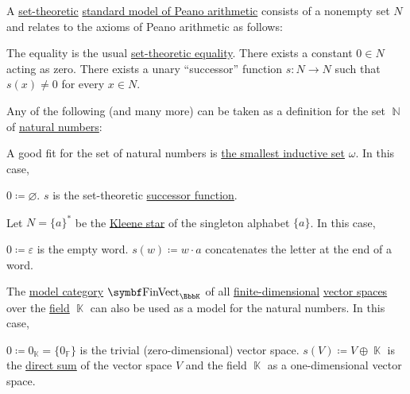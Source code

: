 \begin{example}\label{ex:natural_numbers_models}
  A \hyperref[sec:set_theory]{set-theoretic} \hyperref[def:peano_arithmetic]{standard model of Peano arithmetic} consists of a nonempty set \( N \) and relates to the axioms of Peano arithmetic as follows:
  \begin{RefList}
     The equality is the usual \hyperref[def:set_zfc]{set-theoretic equality}.
     There exists a constant \( 0 \in N \) acting as zero.
     There exists a unary \enquote{successor} function \( s: N \to N \) such that \( s(x) \neq 0 \) for every \( x \in N \).
  \end{RefList}

  Any of the following (and many more) can be taken as a definition for the set \( \BbbN \) of \hyperref[def:natural_numbers]{natural numbers}:
  \begin{DefEnum}
     A good fit for the set of natural numbers is \hyperref[def:smallest_inductive_set]{the smallest inductive set} \( \omega \). In this case,
    \begin{RefList}
       \( 0 \coloneqq \varnothing \).
       \( s \) is the set-theoretic \hyperref[def:successor_operator]{successor function}.
    \end{RefList}

     Let \( N = \{ a \}^{*} \) be the \hyperref[def:language/kleene_star]{Kleene star} of the singleton alphabet \( \{ a \} \). In this case,
    \begin{RefList}
       \( 0 \coloneqq \varepsilon \) is the empty word.
       \( s(w) \coloneqq w \cdot a \) concatenates the letter at the end of a word.
    \end{RefList}

     The \hyperref[def:first_order_model_category]{model category} \( \Cat{FinVect}_{\BbbK} \) of all \hyperref[def:vector_space_dimension]{finite-dimensional} \hyperref[def:vector_space]{vector spaces} over the \hyperref[def:field]{field} \( \BbbK \) can also be used as a model for the natural numbers. In this case,
    \begin{RefList}
       \( 0 \coloneqq 0_{\BbbK} = \{ 0_{\BbbF} \} \) is the trivial (zero-dimensional) vector space.
       \( s(V) \coloneqq V \oplus \BbbK \) is the \hyperref[def:left_module_direct_product]{direct sum} of the vector space \( V \) and the field \( \BbbK \) as a one-dimensional vector space.
    \end{RefList}
  \end{DefEnum}
\end{example}

